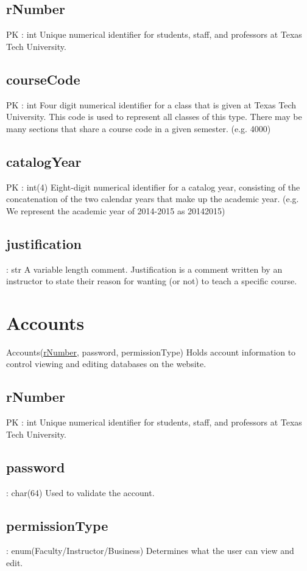 	\subsection{rNumber}
		PK : int
		Unique numerical identifier for students, staff, and professors at Texas Tech University.
	
	\subsection{courseCode}
		PK : int
		Four digit numerical identifier for a class that is given at Texas Tech University. This code is used to represent all classes of this type. There may be many sections that share a course code in a given semester. (e.g. 4000)
	
	\subsection{catalogYear}
		PK : int(4) 
		Eight-digit numerical identifier for a catalog year, consisting of the concatenation of the two calendar years that make up the academic year. (e.g. We represent the academic year of 2014-2015 as 20142015)
	
	\subsection{justification}
		: str
		A variable length comment. Justification is a comment written by an instructor to state their reason for wanting (or not) to teach a specific course. 


\section{Accounts}
	Accounts(\underline{rNumber}, password, permissionType) 
		Holds account information to control viewing and editing databases on the website.
	
	\subsection{rNumber}
		PK : int 
		Unique numerical identifier for students, staff, and professors at Texas Tech University.
    
    \subsection{password}
    	: char(64)
    	Used to validate the account.
    
    \subsection{permissionType}
	    : enum(Faculty/Instructor/Business) 
		Determines what the user can view and edit.